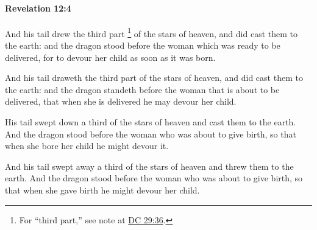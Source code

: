 		\paragraph{Revelation 12:4} %
			\label{REVELATIONNT-12-4}

			And his tail drew the third part%
				\footnote{%
					For ``third part,'' see note at \hyperref[DC29-36]{DC 29:36}.
					}
			of the stars of heaven, and did cast them to the earth: and the dragon stood before the woman which was ready to be delivered, for to devour her child as soon as it was born.

			\begin{framed}
			\scriptsize
				\begin{compactdesc}
					\item[SBLG] 
					\item[ASV] And his tail draweth the third part of the stars of heaven, and did cast them to the earth: and the dragon standeth before the woman that is about to be delivered, that when she is delivered he may devour her child.
					\item[ESV] His tail swept down a third of the stars of heaven and cast them to the earth. And the dragon stood before the woman who was about to give birth, so that when she bore her child he might devour it.
					\item[NASB] And his tail swept away a third of the stars of heaven and threw them to the earth. And the dragon stood before the woman who was about to give birth, so that when she gave birth he might devour her child.

\end{compactdesc}
\end{framed}
